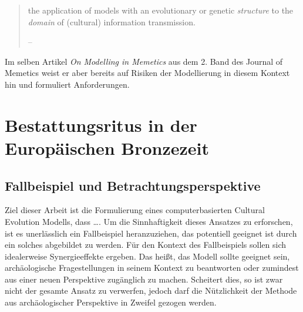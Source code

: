 \documentclass[openany,twoside,twocolumn]{book}
\let\pby\printbibliography
\renewcommand{\printbibliography}{}
\begin{document}
\begin{quote}
the application of models with an evolutionary or genetic
\emph{structure} to the \emph{domain} of (cultural) information
transmission.

-- \textcite{edmonds_modelling_1998}
\end{quote}

Im selben Artikel \emph{On Modelling in Memetics} aus dem 2. Band des
Journal of Memetics weist er aber bereits auf Risiken der Modellierung
in diesem Kontext hin und formuliert Anforderungen.

\pby[title={Literatur},segment=\therefsegment,heading=subbibintoc]

\hypertarget{bronze-age-burial-rites}{%
\chapter{Bestattungsritus in der Europäischen
Bronzezeit}\label{bronze-age-burial-rites}}

\hypertarget{fallbeispiel-und-betrachtungsperspektive}{%
\section{Fallbeispiel und
Betrachtungsperspektive}\label{fallbeispiel-und-betrachtungsperspektive}}

Ziel dieser Arbeit ist die Formulierung eines computerbasierten Cultural
Evolution Modells, dass \ldots{}. Um die Sinnhaftigkeit dieses Ansatzes
zu erforschen, ist es unerlässlich ein Fallbeispiel heranzuziehen, das
potentiell geeignet ist durch ein solches abgebildet zu werden. Für den
Kontext des Fallbeispiels sollen sich idealerweise Synergieeffekte
ergeben. Das heißt, das Modell sollte geeignet sein, archäologische
Fragestellungen in seinem Kontext zu beantworten oder zumindest aus
einer neuen Perspektive zugänglich zu machen. Scheitert dies, so ist
zwar nicht der gesamte Ansatz zu verwerfen, jedoch darf die Nützlichkeit
der Methode aus archäologischer Perspektive in Zweifel gezogen werden.
\end{document}
